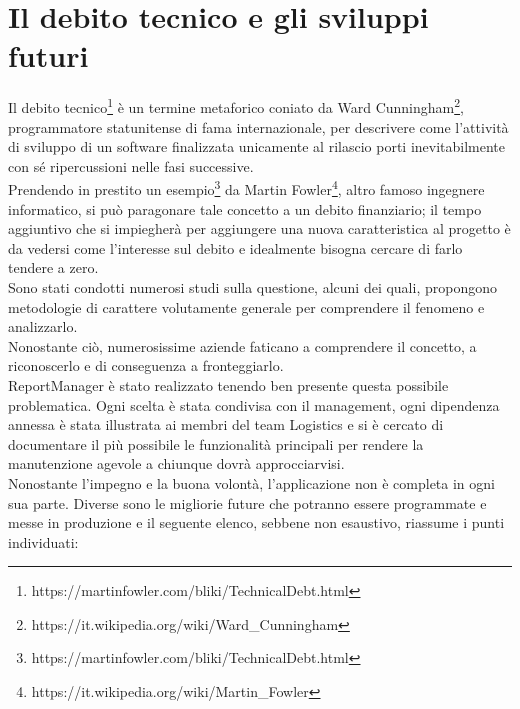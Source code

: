 \chapter{Il debito tecnico e gli sviluppi futuri}\label{c:technical_debt}

Il debito tecnico\footnote{https://martinfowler.com/bliki/TechnicalDebt.html} è un termine metaforico coniato
da Ward Cunningham\footnote{https://it.wikipedia.org/wiki/Ward\_Cunningham}, programmatore statunitense di fama
internazionale, per descrivere come l'attività di sviluppo di un software finalizzata unicamente al rilascio
porti inevitabilmente con sé ripercussioni nelle fasi successive.
\\
Prendendo in prestito un esempio\footnote{https://martinfowler.com/bliki/TechnicalDebt.html} da Martin Fowler\footnote{https://it.wikipedia.org/wiki/Martin\_Fowler}, altro famoso ingegnere informatico, si può paragonare
tale concetto a un debito finanziario; il tempo aggiuntivo che si impiegherà per aggiungere una nuova
caratteristica al progetto è da vedersi come l'interesse sul debito e idealmente bisogna cercare di farlo tendere
a zero.
\\
Sono stati condotti numerosi studi sulla questione, alcuni dei quali\cite{tom2013exploration}, propongono metodologie
di carattere volutamente generale per comprendere il fenomeno e analizzarlo.
\\
Nonostante ciò, numerosissime aziende faticano a comprendere il concetto, a riconoscerlo e di conseguenza a
fronteggiarlo.
\\
ReportManager è stato realizzato tenendo ben presente questa possibile problematica.
Ogni scelta è stata condivisa con il management, ogni dipendenza annessa è stata illustrata ai membri del team
Logistics e si è cercato di documentare il più possibile le funzionalità principali per rendere la manutenzione
agevole a chiunque dovrà approcciarvisi.
\\
Nonostante l'impegno e la buona volontà, l'applicazione non è completa in ogni sua parte.
Diverse sono le migliorie future che potranno essere programmate e messe in produzione e il seguente elenco,
sebbene non esaustivo, riassume i punti individuati:
